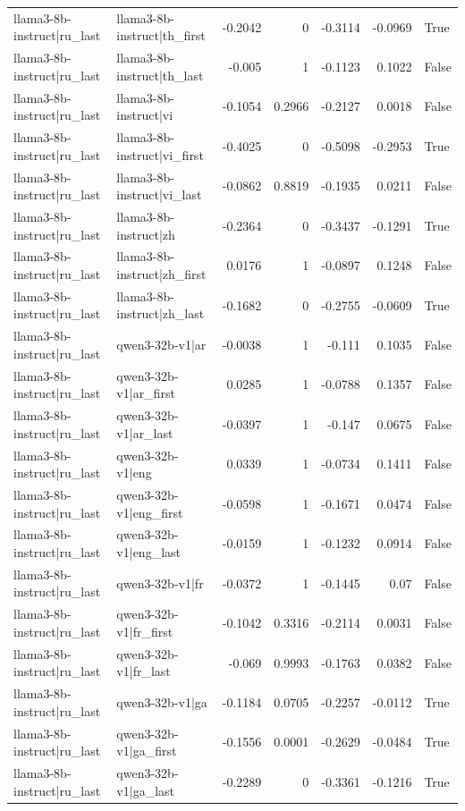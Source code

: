 \begin{table}
\begin{tabular}{l l r r r r l}
llama3-8b-instruct|ru_last & llama3-8b-instruct|th_first & -0.2042 & 0 & -0.3114 & -0.0969 & True \\
llama3-8b-instruct|ru_last & llama3-8b-instruct|th_last & -0.005 & 1 & -0.1123 & 0.1022 & False \\
llama3-8b-instruct|ru_last & llama3-8b-instruct|vi & -0.1054 & 0.2966 & -0.2127 & 0.0018 & False \\
llama3-8b-instruct|ru_last & llama3-8b-instruct|vi_first & -0.4025 & 0 & -0.5098 & -0.2953 & True \\
llama3-8b-instruct|ru_last & llama3-8b-instruct|vi_last & -0.0862 & 0.8819 & -0.1935 & 0.0211 & False \\
llama3-8b-instruct|ru_last & llama3-8b-instruct|zh & -0.2364 & 0 & -0.3437 & -0.1291 & True \\
llama3-8b-instruct|ru_last & llama3-8b-instruct|zh_first & 0.0176 & 1 & -0.0897 & 0.1248 & False \\
llama3-8b-instruct|ru_last & llama3-8b-instruct|zh_last & -0.1682 & 0 & -0.2755 & -0.0609 & True \\
llama3-8b-instruct|ru_last & qwen3-32b-v1|ar & -0.0038 & 1 & -0.111 & 0.1035 & False \\
llama3-8b-instruct|ru_last & qwen3-32b-v1|ar_first & 0.0285 & 1 & -0.0788 & 0.1357 & False \\
llama3-8b-instruct|ru_last & qwen3-32b-v1|ar_last & -0.0397 & 1 & -0.147 & 0.0675 & False \\
llama3-8b-instruct|ru_last & qwen3-32b-v1|eng & 0.0339 & 1 & -0.0734 & 0.1411 & False \\
llama3-8b-instruct|ru_last & qwen3-32b-v1|eng_first & -0.0598 & 1 & -0.1671 & 0.0474 & False \\
llama3-8b-instruct|ru_last & qwen3-32b-v1|eng_last & -0.0159 & 1 & -0.1232 & 0.0914 & False \\
llama3-8b-instruct|ru_last & qwen3-32b-v1|fr & -0.0372 & 1 & -0.1445 & 0.07 & False \\
llama3-8b-instruct|ru_last & qwen3-32b-v1|fr_first & -0.1042 & 0.3316 & -0.2114 & 0.0031 & False \\
llama3-8b-instruct|ru_last & qwen3-32b-v1|fr_last & -0.069 & 0.9993 & -0.1763 & 0.0382 & False \\
llama3-8b-instruct|ru_last & qwen3-32b-v1|ga & -0.1184 & 0.0705 & -0.2257 & -0.0112 & True \\
llama3-8b-instruct|ru_last & qwen3-32b-v1|ga_first & -0.1556 & 0.0001 & -0.2629 & -0.0484 & True \\
llama3-8b-instruct|ru_last & qwen3-32b-v1|ga_last & -0.2289 & 0 & -0.3361 & -0.1216 & True \\

\end{tabular}
\end{table}
